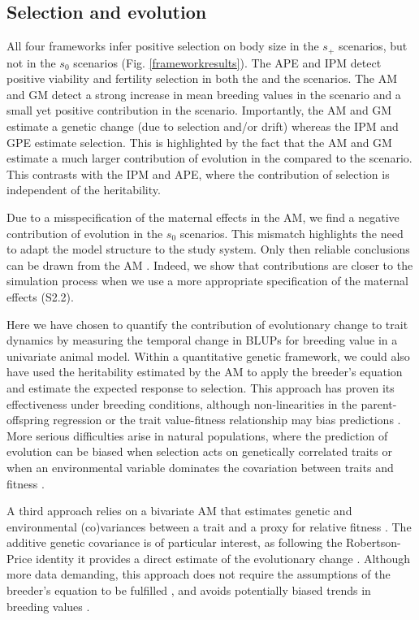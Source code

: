 \subsection*{Selection and evolution}
All four frameworks infer positive selection on body size in the $s_+$ scenarios, but not in the $s_0$ scenarios (Fig. \ref{frameworkresults}). The APE and IPM detect positive viability and fertility selection in both the \SH and the \Sh scenarios. The AM and GM detect a strong increase in mean breeding values in the \SH scenario and a small yet positive contribution in the \Sh scenario. Importantly, the AM and GM estimate a genetic change (due to selection and/or drift) whereas the IPM and GPE estimate selection. This is highlighted by the fact that the AM and GM estimate a much larger contribution of evolution in the \SH compared to the \Sh scenario. This contrasts with the IPM and APE, where the contribution of selection is independent of the heritability. 

Due to a misspecification of the maternal effects in the AM, we find a negative contribution of evolution in the $s_0$ scenarios. This mismatch highlights the need to adapt the model structure to the study system. Only then reliable conclusions can be drawn from the AM \parencite[see also][]{Hadfield2011}. Indeed, we show that contributions are closer to the simulation process when we use a more appropriate specification of the maternal effects (S2.2). 

Here we have chosen to quantify the contribution of evolutionary change to trait dynamics by measuring the temporal change in BLUPs for breeding value in a univariate animal model. Within a quantitative genetic framework, we could also have used the heritability estimated by the AM to apply the breeder's equation and estimate the expected response to selection. This approach has proven its effectiveness under breeding conditions, although non-linearities in the parent-offspring regression or the trait value-fitness relationship may bias predictions \parencite{Heywood2005}. More serious difficulties arise in natural populations, where the prediction of evolution can be biased when selection acts on genetically correlated traits or when an environmental variable dominates the covariation between traits and fitness \parencite{Rausher1992,Morrissey2010}.

A third approach relies on a bivariate AM that estimates genetic and environmental (co)variances between a trait and a proxy for relative fitness \parencite{Lande1979,Lynch2014}. The additive genetic covariance is of particular interest, as following the Robertson-Price identity it provides a direct estimate of the evolutionary change \parencite{Robertson1966,Price1970,Lynch2014}. Although more data demanding, this approach does not require the assumptions of the breeder's equation to be fulfilled \parencite{Morrissey2012sts}, and avoids potentially biased trends in breeding values \parencite{Postma2006}.

